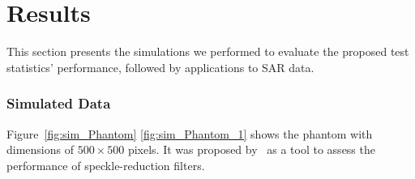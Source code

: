 \chapter{Results}\label{chp:results}

This section presents the simulations we performed to evaluate the
proposed test statistics' performance, followed by applications to SAR
data.

\subsection{Simulated Data}\label{simulated-data}

Figure~\ref{fig:sim_Phantom} \ref{fig:sim_Phantom_1} shows the phantom with dimensions of
\(500\times500\) pixels.
 It was proposed by~\citet{Gomez2017} as a tool
to assess the performance of speckle-reduction filters.

